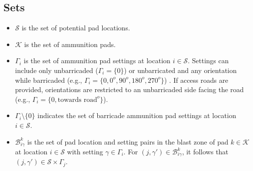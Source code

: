 \documentclass[10pt]{article}
\begin{document}
	\subsection{Sets}
	\begin{itemize}
		\item $\mathcal{S}$ is the set of potential pad locations.
		\item $\mathcal{K}$ is the set of ammunition pads.
		\item $\Gamma_i$ is the set of ammunition pad settings at location $ i \in \mathcal{S}$. Settings can include only unbarricaded ($\Gamma_i = \{0\}$) or unbarricated and any orientation while barricaded (e.g., $\Gamma_i = \{0, 0^o, 90^o, 180^o, 270^o\}$) . If access roads are provided, orientations are restricted to an unbarricaded side facing the road (e.g., $\Gamma_i = \{0, \text{towards road}^o\}$).
		\item $\Gamma_i \setminus \{0\}$ indicates the set of barricade ammunition pad settings at location $i \in \mathcal{S}$.
		\item $ \mathcal{B}_{i\gamma}^{k} $ is the set of pad location and setting pairs in the blast zone of pad $ k \in \mathcal{K}$ at location $ i \in \mathcal{S}$ with setting $ \gamma \in \Gamma_i $. For $ (j, \gamma') \in \mathcal{B}_{i\gamma}^{k} $, it follows that $ (j, \gamma') \in \mathcal{S} \times \Gamma_j $.
	\end{itemize}
	
\end{document}
